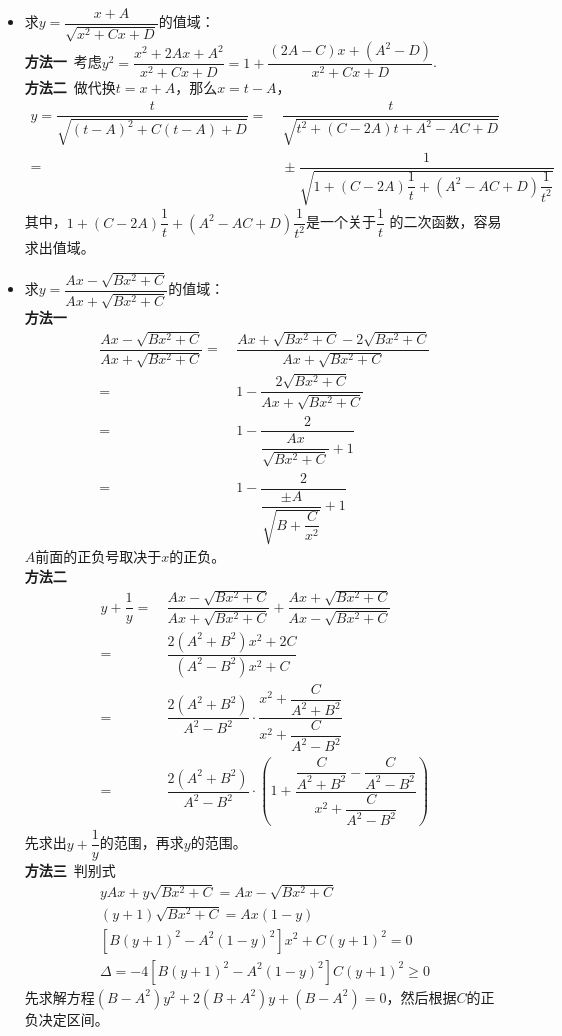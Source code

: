 \begin{itemize}[leftmargin=\inteval{\myitemleftmargin}pt,itemsep=
   \inteval{\myitemitempsep}pt,topsep=\inteval{\myitemtopsep}pt]
\item 求$ y=\dfrac{x+A}{\sqrt{x^2+Cx+D}} $的值域：\\
\textbf{方法一}\ 考虑$ y^2=\dfrac{x^2+2Ax+A^2}{x^2+Cx+D}
=1+\dfrac{(2A-C)x+(A^2-D)}{x^2+Cx+D} $. \\
\textbf{方法二}\ 做代换$ t=x+A $，那么$ x=t-A $，
\begin{align*}
    y=\dfrac{t}{\sqrt{(t-A)^2+C(t-A)+D}}=&\ \dfrac{t}{\sqrt{t^2+(C-2A)t+A^2-AC+D}} \\
    =&\  \pm \dfrac{1}{\sqrt{1+(C-2A)\dfrac{1}{t}+(A^2-AC+D)\dfrac{1}{t^2}}}
\end{align*}
其中，$ 1+(C-2A)\dfrac{1}{t}+(A^2-AC+D)\dfrac{1}{t^2} $是一个关于$ \dfrac{1}{t} $
的二次函数，容易求出值域。

\item 求$ y= \dfrac{Ax-\sqrt{Bx^2+C}}{Ax+\sqrt{Bx^2+C}} $的值域：\\
\textbf{方法一}
\begin{align*}
    \dfrac{Ax-\sqrt{Bx^2+C}}{Ax+\sqrt{Bx^2+C}} =&\  
    \dfrac{Ax+\sqrt{Bx^2+C}-2\sqrt{Bx^2+C}}{Ax+\sqrt{Bx^2+C}} \\
    =&\  1-\dfrac{2\sqrt{Bx^2+C}}{Ax+\sqrt{Bx^2+C}} \\
    =&\  1-\dfrac{2}{\dfrac{Ax}{\sqrt{Bx^2+C}}+1} \\
    =&\  1-\dfrac{2}{\dfrac{\pm A}{\sqrt{B+\dfrac{C}{x^2}}}+1} 
\end{align*}
$ A $前面的正负号取决于$ x $的正负。\\
\textbf{方法二}
\begin{align*}
    y+\dfrac{1}{y}=&\ \dfrac{Ax-\sqrt{Bx^2+C}}{Ax+\sqrt{Bx^2+C}}+
    \dfrac{Ax+\sqrt{Bx^2+C}}{Ax-\sqrt{Bx^2+C}}   \\
    =&\ \dfrac{2(A^2+B^2)x^2+2C}{(A^2-B^2)x^2+C} \\
    =&\ \dfrac{2(A^2+B^2)}{A^2-B^2}\cdot
    \dfrac{x^2+\dfrac{C}{A^2+B^2}}{x^2+\dfrac{C}{A^2-B^2}} \\
    =&\ \dfrac{2(A^2+B^2)}{A^2-B^2}\cdot \left(1+
    \dfrac{\dfrac{C}{A^2+B^2}-\dfrac{C}{A^2-B^2}}{x^2+\dfrac{C}{A^2-B^2}} \right)
\end{align*}
先求出$ y+\dfrac{1}{y} $的范围，再求$ y $的范围。\\
\textbf{方法三}\ 判别式
\begin{gather*}
    yAx+y\sqrt{Bx^2+C}=Ax-\sqrt{Bx^2+C} \\
    (y+1)\sqrt{Bx^2+C}=Ax(1-y)  \\
    [B(y+1)^2-A^2(1-y)^2]x^2+C(y+1)^2=0 \\
    \Delta =-4[B(y+1)^2-A^2(1-y)^2]C(y+1)^2\geq 0
\end{gather*}
先求解方程$ (B-A^2)y^2+2(B+A^2)y+(B-A^2)=0 $，然后根据$ C $的正负决定区间。


\end{itemize}
